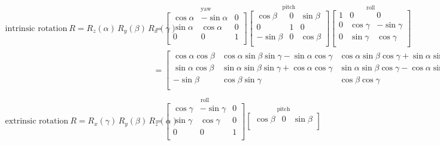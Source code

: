 \begin{align}
  \text{intrinsic rotation} \
  R = R_z(\alpha) \, R_y(\beta) \, R_x(\gamma) &=
  \overset{\text{yaw}}
  {\begin{bmatrix}
    \cos \alpha & -\sin \alpha & 0 \\
    \sin \alpha &  \cos \alpha & 0 \\
              0 &            0 & 1 \\
  \end{bmatrix}}
  \overset{\text{pitch}}
  {\begin{bmatrix}
     \cos \beta & 0 & \sin \beta \\
              0 & 1 &          0 \\
    -\sin \beta & 0 & \cos \beta \\
  \end{bmatrix}}
  \overset{\text{roll}}
  {\begin{bmatrix}
    1 &  0          &            0 \\
    0 & \cos \gamma & -\sin \gamma \\
    0 & \sin \gamma &  \cos \gamma \\
  \end{bmatrix}} \\
  &= \begin{bmatrix}
        \cos\alpha\cos\beta &
          \cos\alpha\sin\beta\sin\gamma - \sin\alpha\cos\gamma &
          \cos\alpha\sin\beta\cos\gamma + \sin\alpha\sin\gamma \\
        \sin\alpha\cos\beta &
          \sin\alpha\sin\beta\sin\gamma + \cos\alpha\cos\gamma &
          \sin\alpha\sin\beta\cos\gamma - \cos\alpha\sin\gamma \\
       -\sin\beta & \cos\beta\sin\gamma & \cos\beta\cos\gamma \\
  \end{bmatrix} \\
\\
\text{extrinsic rotation} \
  R = R_x(\gamma) \, R_y(\beta) \, R_z(\alpha) &=
  \overset{\text{roll}}
  {\begin{bmatrix}
    \cos \gamma & -\sin \gamma & 0 \\
    \sin \gamma &  \cos \gamma & 0 \\
     0          &   0          & 1 \\
  \end{bmatrix}}
  \overset{\text{pitch}}
  {\begin{bmatrix}
    \cos \beta & 0 & \sin \beta \\

\end{bmatrix}}
\end{align}
